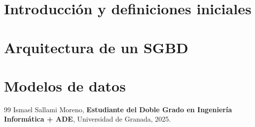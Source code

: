 \documentclass[a4paper,12pt]{book}
\begin{document}
\chapter{Introducción y definiciones iniciales}



\chapter{Arquitectura de un SGBD}



\chapter{Modelos de datos}




\newpage
\begin{thebibliography}{99}
Ismael Sallami Moreno, \textbf{Estudiante del Doble Grado en Ingeniería Informática + ADE}, Universidad de Granada, 2025.

\end{thebibliography}
\end{document}
